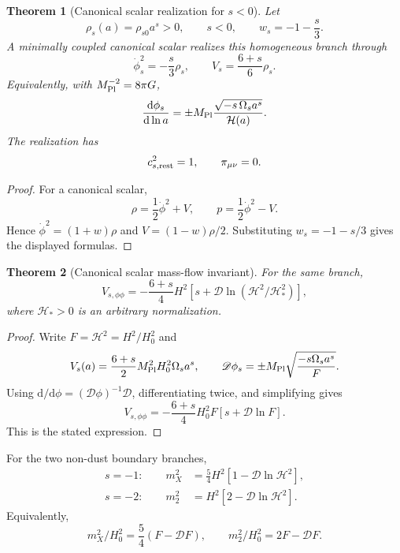 \documentclass[aps,prd,preprint,onecolumn,nofootinbib,superscriptaddress,showkeys]{revtex4-2}
\numberwithin{equation}{section}
\theoremstyle{definition}
\theoremstyle{plain}
\newtheorem{theorem}{Theorem}[section]
\newcommand{\dd}{\mathrm d}
\newcommand{\Dil}{\mathscr D}
\begin{document}
\begin{theorem}[Canonical scalar realization for \(s<0\)]
Let
\begin{equation}
\rho_s(a)=\rho_{s0}a^s>0,
\qquad
s<0,
\qquad
w_s=-1-\frac s3.
\end{equation}
A minimally coupled canonical scalar realizes this homogeneous branch through
\begin{equation}
\dot\phi_s^2=-\frac{s}{3}\rho_s,
\qquad
V_s=\frac{6+s}{6}\rho_s.
\end{equation}
Equivalently, with \(M_{\rm Pl}^{-2}=8\pi G\),
\begin{equation}
\frac{\dd\phi_s}{\dd\ln a}
=
\pm M_{\rm Pl}
\frac{\sqrt{-s\,\Omega_s a^s}}{\mathcal H(a)}.
\end{equation}
The realization has
\begin{equation}
c_{s,\rm rest}^2=1,
\qquad
\pi_{\mu\nu}=0.
\end{equation}
\end{theorem}

\begin{proof}
For a canonical scalar,
\[
\rho=\frac12\dot\phi^2+V,
\qquad
p=\frac12\dot\phi^2-V.
\]
Hence \(\dot\phi^2=(1+w)\rho\) and \(V=(1-w)\rho/2\).  Substituting \(w_s=-1-s/3\) gives the displayed formulas.
\end{proof}

\begin{theorem}[Canonical scalar mass-flow invariant]
For the same branch,
\begin{equation}
\boxed{
V_{s,\phi\phi}
=
-\frac{6+s}{4}H^2
\left[
s+\Dil\ln(\mathcal H^2/\mathcal H_*^2)
\right],
}
\end{equation}
where \(\mathcal H_*>0\) is an arbitrary normalization.
\end{theorem}

\begin{proof}
Write \(F=\mathcal H^2=H^2/H_0^2\) and
\[
V_s(a)=\frac{6+s}{2}M_{\rm Pl}^2H_0^2\Omega_sa^s,
\qquad
\Dil\phi_s=\pm M_{\rm Pl}\sqrt{\frac{-s\Omega_sa^s}{F}}.
\]
Using \(\dd/\dd\phi=(\Dil\phi)^{-1}\Dil\), differentiating twice, and simplifying gives
\[
V_{s,\phi\phi}
=
-\frac{6+s}{4}H_0^2F
\left[s+\Dil\ln F\right].
\]
This is the stated expression.
\end{proof}

For the two non-dust boundary branches,
\begin{align}
s=-1:\qquad
m_X^2&=\frac54H^2\left[1-\Dil\ln \mathcal H^2\right],\\
s=-2:\qquad
m_2^2&=H^2\left[2-\Dil\ln \mathcal H^2\right].
\end{align}
Equivalently,
\begin{equation}
m_X^2/H_0^2=\frac54(F-\Dil F),
\qquad
m_2^2/H_0^2=2F-\Dil F.
\end{equation}
\end{document}
